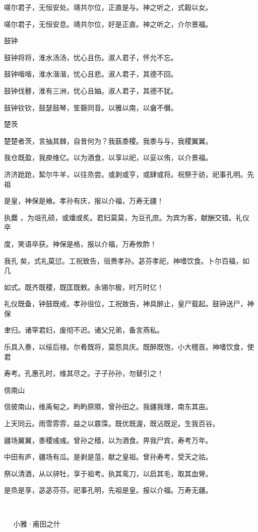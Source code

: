 嗟尔君子，无恒安处。靖共尔位，正直是与。神之听之，式穀以女。

嗟尔君子，无恒安息。靖共尔位，好是正直。神之听之，介尔景福。

鼓钟

鼓钟将将，淮水汤汤，忧心且伤。淑人君子，怀允不忘。

鼓钟喈喈，淮水湝湝，忧心且悲。淑人君子，其德不回。

鼓钟伐鼛，淮有三洲，忧心且妯。淑人君子，其德不犹。

鼓钟钦钦，鼓瑟鼓琴，笙磬同音。以雅以南，以龠不僭。

楚茨

楚楚者茨，言抽其棘，自昔何为？我蓺黍稷。我黍与与，我稷翼翼。

我仓既盈，我庾维亿。以为酒食，以享以祀，以妥以侑，以介景福。

济济跄跄，絜尔牛羊，以往烝尝。或剥或亨，或肆或将。祝祭于祊，祀事孔明。先祖

是皇，神保是飨。孝孙有庆，报以介福，万寿无疆！

执爨 ，为俎孔硕，或燔或炙。君妇莫莫，为豆孔庶。为宾为客，献酬交错。礼仪卒

度，笑语卒获。神保是格，报以介福，万寿攸酢！

我孔 矣，式礼莫愆。工祝致告，徂赉孝孙。苾芬孝祀，神嗜饮食。卜尔百福，如几

如式。既齐既稷，既匡既敕。永锡尔极，时万时亿！

礼仪既备，钟鼓既戒，孝孙徂位，工祝致告，神具醉止，皇尸载起。鼓钟送尸，神保

聿归。诸宰君妇，废彻不迟。诸父兄弟，备言燕私。

乐具入奏，以绥后禄。尔肴既将，莫怨具庆。既醉既饱，小大稽首。神嗜饮食，使君

寿考。孔惠孔时，维其尽之。子子孙孙，勿替引之！

信南山

信彼南山，维禹甸之。畇畇原隰，曾孙田之。我疆我理，南东其亩。

上天同云。雨雪雰雰，益之以霡霂。既优既渥，既沾既足。生我百谷。

疆场翼翼，黍稷彧彧。曾孙之穑，以为酒食。畀我尸宾，寿考万年。

中田有庐，疆场有瓜。是剥是菹，献之皇祖。曾孙寿考，受天之祜。

祭以清酒，从以骍牡，享于祖考。执其鸾刀，以启其毛，取其血膋。

是烝是享，苾苾芬芬。祀事孔明，先祖是皇。报以介福。万寿无疆。

　

　
小雅·甫田之什


